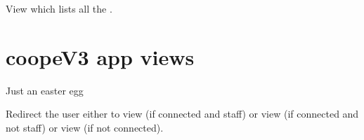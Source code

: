 \documentclass[letterpaper,10pt,english]{sphinxmanual}
\begin{document}

\begin{fulllineitems}
\label{\detokenize{modules/views:preferences.views.paymentMethodsIndex}}
View which lists all the {\hyperref[\detokenize{modules/models:preferences.models.PaymentMethod}]{}}.

\end{fulllineitems}



\section{coopeV3 app views}
\label{\detokenize{modules/views:module-coopeV3.views}}\label{\detokenize{modules/views:coopev3-app-views}}

\begin{fulllineitems}
\label{\detokenize{modules/views:coopeV3.views.coope_runner}}
Just an easter egg

\end{fulllineitems}


\begin{fulllineitems}
\label{\detokenize{modules/views:coopeV3.views.home}}
Redirect the user either to {\hyperref[\detokenize{modules/views:gestion.views.manage}]{}} view (if connected and staff) or {\hyperref[\detokenize{modules/views:coopeV3.views.homepage}]{}} view (if connected and not staff) or {\hyperref[\detokenize{modules/views:users.views.loginView}]{}} view (if not connected).

\end{fulllineitems}
\end{document}

